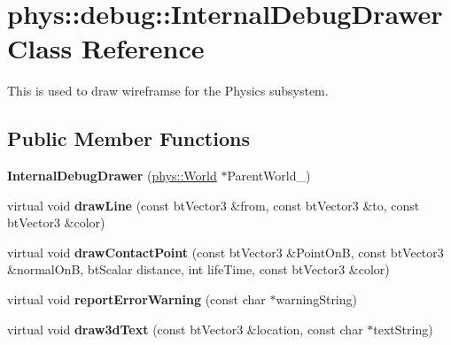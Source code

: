 \hypertarget{classphys_1_1debug_1_1InternalDebugDrawer}{
\section{phys::debug::InternalDebugDrawer Class Reference}
\label{db/d27/classphys_1_1debug_1_1InternalDebugDrawer}
}


This is used to draw wireframse for the Physics subsystem.  


\subsection*{Public Member Functions}
\begin{DoxyCompactItemize}
\item 
\hypertarget{classphys_1_1debug_1_1InternalDebugDrawer_a323f6fa6e2979e989d0096bf3a304198}{
{\bfseries InternalDebugDrawer} (\hyperlink{classphys_1_1World}{phys::World} $\ast$ParentWorld\_\-)}
\label{db/d27/classphys_1_1debug_1_1InternalDebugDrawer_a323f6fa6e2979e989d0096bf3a304198}

\item 
\hypertarget{classphys_1_1debug_1_1InternalDebugDrawer_a8a35c3c80fddaaec8e21f737ed1b3938}{
virtual void {\bfseries drawLine} (const btVector3 \&from, const btVector3 \&to, const btVector3 \&color)}
\label{db/d27/classphys_1_1debug_1_1InternalDebugDrawer_a8a35c3c80fddaaec8e21f737ed1b3938}

\item 
\hypertarget{classphys_1_1debug_1_1InternalDebugDrawer_a8b912aaff8dfd9f4e97ffb2d867121b2}{
virtual void {\bfseries drawContactPoint} (const btVector3 \&PointOnB, const btVector3 \&normalOnB, btScalar distance, int lifeTime, const btVector3 \&color)}
\label{db/d27/classphys_1_1debug_1_1InternalDebugDrawer_a8b912aaff8dfd9f4e97ffb2d867121b2}

\item 
\hypertarget{classphys_1_1debug_1_1InternalDebugDrawer_a4e3b4cbc861f76696b4d32f0cf068ea6}{
virtual void {\bfseries reportErrorWarning} (const char $\ast$warningString)}
\label{db/d27/classphys_1_1debug_1_1InternalDebugDrawer_a4e3b4cbc861f76696b4d32f0cf068ea6}

\item 
\hypertarget{classphys_1_1debug_1_1InternalDebugDrawer_a1266d3fad8868ade2d515e9c92e76b4a}{
virtual void {\bfseries draw3dText} (const btVector3 \&location, const char $\ast$textString)}
\label{db/d27/classphys_1_1debug_1_1InternalDebugDrawer_a1266d3fad8868ade2d515e9c92e76b4a}


\end{DoxyCompactItemize}

